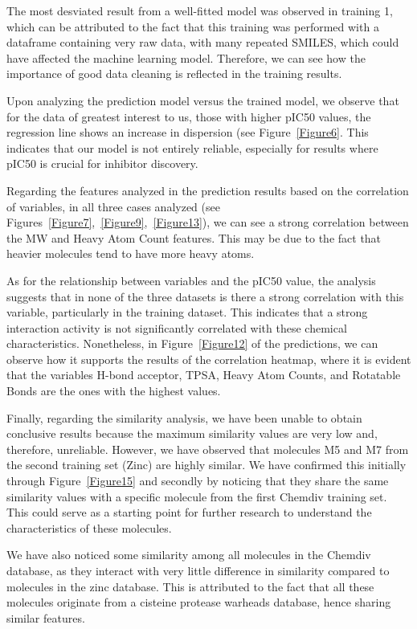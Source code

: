 \documentclass[final,times,twocolumn,article]{elsarticle}
\begin{document}
The most desviated result from a well-fitted model was observed in training 1, which can be attributed to the fact that this training was performed with a dataframe containing very raw data, with many repeated SMILES, which could have affected the machine learning model. Therefore, we can see how the importance of good data cleaning is reflected in the training results.

Upon analyzing the prediction model versus the trained model, we observe that for the data of greatest interest to us, those with higher pIC50 values, the regression line shows an increase in dispersion (see Figure~\ref{Figure6}. This indicates that our model is not entirely reliable, especially for results where pIC50 is crucial for inhibitor discovery.

Regarding the features analyzed in the prediction results based on the correlation of variables, in all three cases analyzed (see Figures~\ref{Figure7},~\ref{Figure9},~\ref{Figure13}), we can see a strong correlation between the MW and Heavy Atom Count features. This may be due to the fact that heavier molecules tend to have more heavy atoms.

As for the relationship between variables and the pIC50 value, the analysis suggests that in none of the three datasets is there a strong correlation with this variable, particularly in the training dataset. This indicates that a strong interaction activity is not significantly correlated with these chemical characteristics. Nonetheless, in Figure~\ref{Figure12} of the predictions, we can observe how it supports the results of the correlation heatmap, where it is evident that the variables H-bond acceptor, TPSA, Heavy Atom Counts, and Rotatable Bonds are the ones with the highest values.

Finally, regarding the similarity analysis, we have been unable to obtain conclusive results because the maximum similarity values are very low and, therefore, unreliable. However, we have observed that molecules M5 and M7 from the second training set (Zinc) are highly similar. We have confirmed this initially through Figure~\ref{Figure15} and secondly by noticing that they share the same similarity values with a specific molecule from the first Chemdiv training set. This could serve as a starting point for further research to understand the characteristics of these molecules.

We have also noticed some similarity among all molecules in the Chemdiv database, as they interact with very little difference in similarity compared to molecules in the zinc database. This is attributed to the fact that all these molecules originate from a cisteine protease warheads database, hence sharing similar features.
\end{document}
